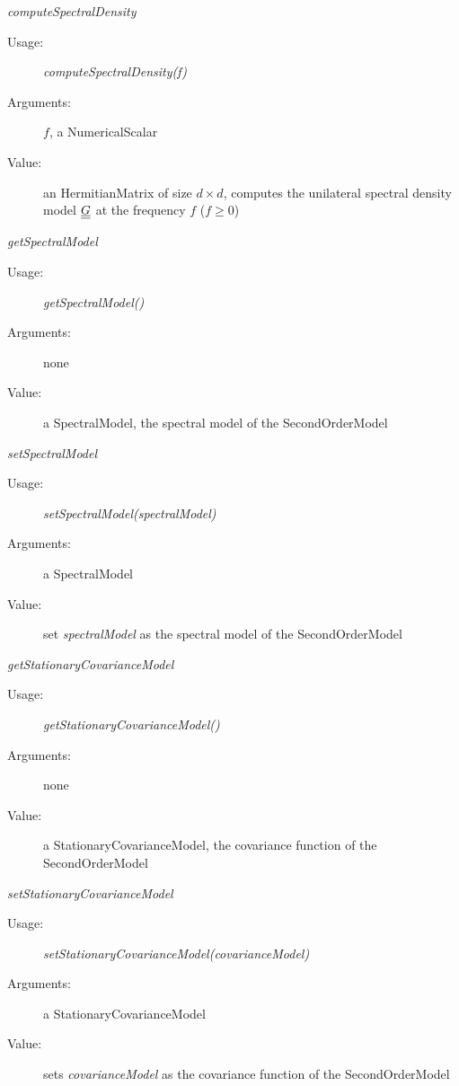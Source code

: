 \begin{description}
\begin{description}
\item \textit{computeSpectralDensity}
\begin{description}
\item[Usage:] \textit{computeSpectralDensity(f)}
\item[Arguments:] $f$,  a NumericalScalar
\item[Value:] an HermitianMatrix of size $d \times d$, computes the unilateral spectral density model ${\underline{\underline{G}}}$ at the frequency $f$ ($f \geq 0$)
\end{description}
\bigskip

\item \textit{getSpectralModel}
\begin{description}
\item[Usage:] \textit{getSpectralModel()}
\item[Arguments:] none
\item[Value:] a SpectralModel, the spectral model of the SecondOrderModel
\end{description}
\bigskip

\item \textit{setSpectralModel}
\begin{description}
\item[Usage:] \textit{setSpectralModel(spectralModel)}
\item[Arguments:] a SpectralModel
\item[Value:] set \textit{spectralModel} as the spectral model  of the SecondOrderModel
\end{description}
\bigskip

\item \textit{getStationaryCovarianceModel}
\begin{description}
\item[Usage:] \textit{getStationaryCovarianceModel()}
\item[Arguments:] none
\item[Value:] a StationaryCovarianceModel, the covariance function of the SecondOrderModel
\end{description}
\bigskip

\item \textit{setStationaryCovarianceModel}
\begin{description}
\item[Usage:] \textit{setStationaryCovarianceModel(covarianceModel)}
\item[Arguments:] a StationaryCovarianceModel
\item[Value:] sets \textit{covarianceModel} as the covariance function of the SecondOrderModel
\end{description}
\bigskip


\end{description}
\end{description}
